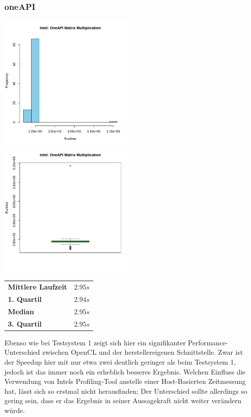 \documentclass[12pt]{article}
\begin{document}
	\subsubsection*{oneAPI}
	\includegraphics[width=0.5\textwidth]{../statistics/intel/oneapi/histogram_matmul.png}
	\includegraphics[width=0.5\textwidth]{../statistics/intel/oneapi/boxplot_matmul.png}
	\\
	\begin{center}
		\begin{tabular}{|l|l|}
			\toprule
			\textbf{Mittlere Laufzeit} 		& $2.95s$ \\
			\textbf{1. Quartil}				& $2.94s$ \\
			\textbf{Median}					& $2.95s$  \\
			\textbf{3. Quartil}				& $2.95s$  \\
			\bottomrule
		\end{tabular}
	\end{center}
	\medskip
	
	Ebenso wie bei Testsystem 1 zeigt sich hier ein signifikanter Performance-Unterschied zwischen OpenCL und der herstellereigenen Schnittstelle.
	Zwar ist der Speedup hier mit \glqq nur\grqq{} etwa zwei deutlich geringer als beim Testsystem 1, jedoch ist das immer noch ein erheblich besseres Ergebnis.
	Welchen Einfluss die Verwendung von Intels Profiling-Tool anstelle einer Host-Basierten Zeitmessung hat, lässt sich so erstmal nicht herausfinden; Der Unterschied sollte allerdings so gering sein, dass er das Ergebnis in seiner Aussagekraft nicht weiter verändern würde.
	
\end{document}
